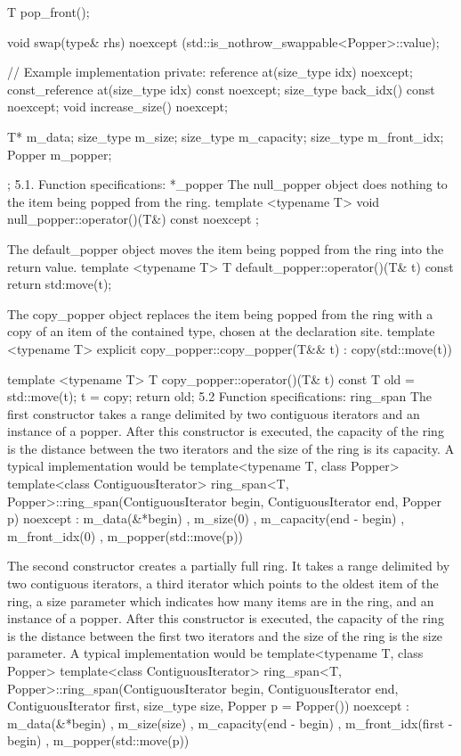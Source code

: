 {{  T pop_front();
 
  void swap(type& rhs)
           noexcept (std::is_nothrow_swappable<Popper>::value);
 
// Example implementation
private:
  reference at(size_type idx) noexcept;
  const_reference at(size_type idx) const noexcept;
  size_type back_idx() const noexcept;
  void increase_size() noexcept;
 
  T* m_data;
  size_type m_size;
  size_type m_capacity;
  size_type m_front_idx;
  Popper m_popper;
};
5.1. Function specifications: *_popper
The null_popper object does nothing to the item being popped from the ring.
 template <typename T>
 void null_popper::operator()(T&) const noexcept
 {};
 
The default_popper object moves the item being popped from the ring into the return value.
 template <typename T>
 T default_popper::operator()(T& t) const
 {
  return std:move(t);
 }
 
The copy_popper object replaces the item being popped from the ring with a copy of an item of the contained type, chosen at the declaration site.
 template <typename T>
 explicit copy_popper::copy_popper(T&& t)
  : copy(std::move(t))
 {}
 
 template <typename T>
 T copy_popper::operator()(T& t) const
 {
  T old = std::move(t);
  t = copy;
  return old;
 }
5.2 Function specifications: ring_span
The first constructor takes a range delimited by two contiguous iterators and an instance of a popper.  After this constructor is executed, the capacity of the ring is the distance between the two iterators and the size of the ring is its capacity.  A typical implementation would be
template<typename T, class Popper>
template<class ContiguousIterator>
ring_span<T, Popper>::ring_span(ContiguousIterator begin, ContiguousIterator end, Popper p) noexcept
  : m_data(&*begin)
  , m_size(0)
  , m_capacity(end - begin)
  , m_front_idx(0)
  , m_popper(std::move(p))
  {}
 
The second constructor creates a partially full ring.  It takes a range delimited by two contiguous iterators, a third iterator which points to the oldest item of the ring, a size parameter which indicates how many items are in the ring, and an instance of a popper.  After this constructor is executed, the capacity of the ring is the distance between the first two iterators and the size of the ring is the size parameter.  A typical implementation would be
template<typename T, class Popper>
template<class ContiguousIterator>
ring_span<T, Popper>::ring_span(ContiguousIterator begin, ContiguousIterator end, ContiguousIterator first, size_type size, Popper p = Popper()) noexcept
  : m_data(&*begin)
  , m_size(size)
  , m_capacity(end - begin)
  , m_front_idx(first - begin)
  , m_popper(std::move(p))
{}
 
}
